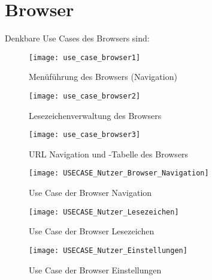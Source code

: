 \author{Gottfried von Recum}

\section{Browser}

Denkbare Use Cases des Browsers sind:
\begin{figure}[h]
	\centering
	\texttt{[image: use\_case\_browser1]}
	\caption{Menüführung des Browsers (Navigation)}
	\label{fig:Browser Navigation}
\end{figure}

\begin{figure}[h]
	\centering
	\texttt{[image: use\_case\_browser2]}
	\caption{Lesezeichenverwaltung des Browsers}
	\label{fig:Browser Lesezeichen}
\end{figure}

\begin{figure}[h]
	\centering
	\texttt{[image: use\_case\_browser3]}
	\caption{URL Navigation und \SECH-Tabelle des Browsers}
	\label{fig:Browser URL}
\end{figure}

\begin{figure}[h]
	\centering
	\texttt{[image: USECASE\_Nutzer\_Browser\_Navigation]}
	\caption{Use Case der Browser Navigation}
	\label{fig:Browser Navigation Use-Case}
\end{figure}

\begin{figure}[h]
	\centering
	\texttt{[image: USECASE\_Nutzer\_Lesezeichen]}
	\caption{Use Case der Browser Lesezeichen}
	\label{fig:Browser Lesezeichen Use-Case}
\end{figure}

\begin{figure}[h]
	\centering
	\texttt{[image: USECASE\_Nutzer\_Einstellungen]}
	\caption{Use Case der Browser Einstellungen}
	\label{fig:Browser Einstellungen Use-Case}
\end{figure}
